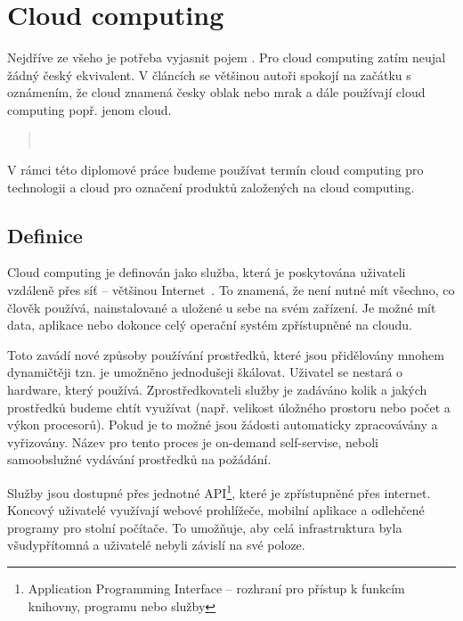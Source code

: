 \chapter{Cloud computing}

Nejdříve ze všeho je potřeba vyjasnit pojem . Pro cloud computing zatím neujal žádný český ekvivalent. V článcích se většinou autoři spokojí na začátku s oznámením, že cloud znamená česky oblak nebo mrak a dále používají cloud computing popř. jenom cloud. 

\begin{quotation}
~\cite{termCloud}
\end{quotation}

V rámci této diplomové práce budeme používat termín cloud computing pro technologii a cloud pro označení produktů  založených na cloud computing.

\section{Definice}
Cloud computing je definován jako služba, která je poskytována uživateli vzdáleně přes síť -- většinou Internet~\cite{defCloud}. To znamená, že není nutné mít všechno, co člověk používá, nainstalované a uložené u sebe na svém zařízení. Je možné mít data, aplikace nebo dokonce celý operační systém zpřístupněné na cloudu. 

Toto zavádí nové způsoby používání prostředků, které jsou přidělovány mnohem dynamičtěji tzn. je umožněno jednodušeji škálovat. Uživatel se nestará o hardware, který používá. Zprostředkovateli služby je zadáváno kolik a jakých prostředků budeme chtít využívat (např. velikost úložného prostoru nebo počet a výkon procesorů). Pokud je to možné jsou žádosti automaticky zpracovávány a vyřizovány. Název pro tento proces je on-demand self-servise, neboli samoobslužné vydávání prostředků na požádání.

Služby jsou dostupné přes jednotné API\footnote{Application Programming Interface -- rozhraní pro přístup k funkcím knihovny, programu nebo služby}, které je zpřístupněné přes internet. Koncový uživatelé využívají webové prohlížeče, mobilní aplikace a odlehčené programy pro stolní počítače. To umožňuje, aby celá infrastruktura byla všudypřítomná a uživatelé nebyli závislí na své poloze.

